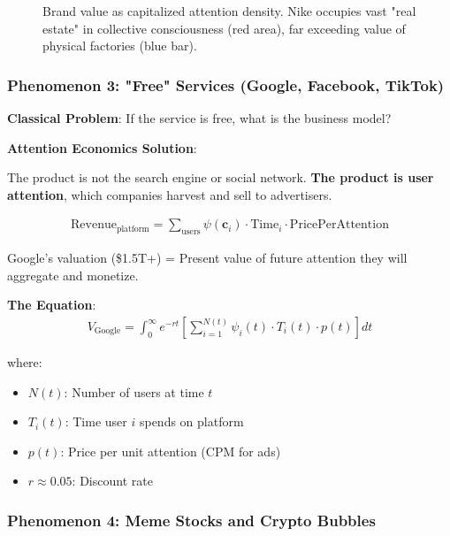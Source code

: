 \documentclass[11pt,a4paper]{article}
\theoremstyle{definition}
\theoremstyle{remark}
\newcommand{\cc}{\mathbf{c}}
\begin{document}
\begin{small}
\begin{figure}[H]
\caption{Brand value as capitalized attention density. Nike occupies vast "real estate" in collective consciousness (red area), far exceeding value of physical factories (blue bar).}
\label{fig:brand_attention_real_estate}
\end{figure}

\subsubsection{Phenomenon 3: "Free" Services (Google, Facebook, TikTok)}

\textbf{Classical Problem}: If the service is free, what is the business model?

\textbf{Attention Economics Solution}:

The product is not the search engine or social network. \textbf{The product is user attention}, which companies harvest and sell to advertisers.

\begin{align}
\text{Revenue}_{\text{platform}} = \sum_{\text{users}} \psi(\cc_i) \cdot \text{Time}_i \cdot \text{PricePerAttention}
\end{align}

Google's valuation (\$1.5T+) = Present value of future attention they will aggregate and monetize.

\textbf{The Equation}:
\begin{align}
V_{\text{Google}} = \int_0^\infty e^{-rt} \left[\sum_{i=1}^{N(t)} \psi_i(t) \cdot T_i(t) \cdot p(t)\right] dt
\end{align}

where:
\begin{itemize}
    \item \(N(t)\): Number of users at time \(t\)
    \item \(T_i(t)\): Time user \(i\) spends on platform
    \item \(p(t)\): Price per unit attention (CPM for ads)
    \item \(r \approx 0.05\): Discount rate
\end{itemize}

\subsubsection{Phenomenon 4: Meme Stocks and Crypto Bubbles}


\end{small}
\end{document}
